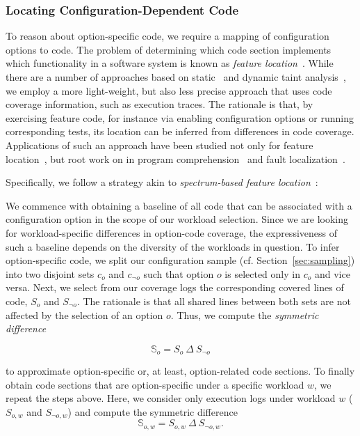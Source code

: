 {{\subsubsection{Locating Configuration-Dependent Code}
To reason about option-specific code, we require a mapping of configuration options to code. 
The problem of determining which code section implements which functionality in a software system is known as \emph{feature location}~\cite{rubin_feature_2013}. 
While there are a number of approaches based on static~\cite{velez_2020_configcrusher_jase,lillack_2018_lotrack_tse,luo_2019_cova} and dynamic taint analysis~\cite{bell_phosphor_2014,velez_comprex_2021,splat_kim_2013}, we employ a more light-weight,  but also less precise approach that uses code coverage information, such as execution traces.
The rationale is that, by exercising feature code, for instance via enabling configuration options or running corresponding tests, its location can be inferred from differences in code coverage. 
Applications of such an approach have been studied not only for feature location~\cite{wong_integrated_2005,sulir_annotation_2015,michelon_spectrum_2021,perez_framing_2016}, but root work on in program comprehension~\cite{wilde_early_1996,wilde_reconnaissance_1995,sherwood_reducing_nodate,perez_diagnosis_2014,castro_pangolin_2019} and fault localization~\cite{agrawal_fault_1995,wong_faultloc_2016}. 
}
Specifically, we follow  a strategy akin to  \textit{spectrum-based feature location}~\cite{michelon_spectrum_2021}:

{\color{edited}
We commence with obtaining a baseline of all code that can be associated with a configuration option in the scope of our workload selection. Since we are looking for workload-specific differences in option-code coverage, the expressiveness of such a baseline depends on the diversity of the workloads in question. To infer option-specific code, we split our configuration sample (cf. Section~\ref{sec:sampling}) into two disjoint sets $c_o$ and $c_{\neg o}$ such that option $o$ is selected only in $c_o$ and vice versa. Next, we select from our coverage logs the corresponding covered lines of code, $S_o$ and $S_{\neg o}$.  The rationale is that all shared lines between both sets are not affected by the selection of an option $o$. Thus, we compute the \textit{symmetric difference} 

$$\mathbb{S}_o = S_o~\Delta~S_{\neg o}$$

 to approximate option-specific or, at least, option-related code sections. To finally obtain code sections that are option-specific under a specific workload $w$, we repeat the steps above. Here, we consider only execution logs under workload $w$ ($S_{o, w}$ and $S_{\neg o, w}$) and compute the symmetric difference $$\mathbb{S}_{o,w}=S_{o,w}~\Delta~S_{\neg o, w}.$$  


}}
